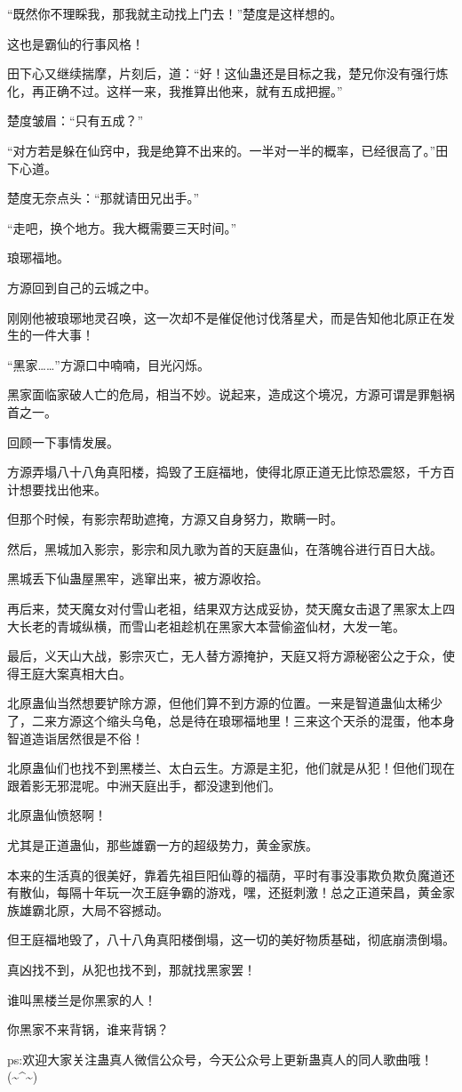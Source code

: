 \begin{this_body}
“既然你不理睬我，那我就主动找上门去！”楚度是这样想的。

这也是霸仙的行事风格！

田下心又继续揣摩，片刻后，道：“好！这仙蛊还是目标之我，楚兄你没有强行炼化，再正确不过。这样一来，我推算出他来，就有五成把握。”

楚度皱眉：“只有五成？”

“对方若是躲在仙窍中，我是绝算不出来的。一半对一半的概率，已经很高了。”田下心道。

楚度无奈点头：“那就请田兄出手。”

“走吧，换个地方。我大概需要三天时间。”

琅琊福地。

方源回到自己的云城之中。

刚刚他被琅琊地灵召唤，这一次却不是催促他讨伐落星犬，而是告知他北原正在发生的一件大事！

“黑家……”方源口中喃喃，目光闪烁。

黑家面临家破人亡的危局，相当不妙。说起来，造成这个境况，方源可谓是罪魁祸首之一。

回顾一下事情发展。

方源弄塌八十八角真阳楼，捣毁了王庭福地，使得北原正道无比惊恐震怒，千方百计想要找出他来。

但那个时候，有影宗帮助遮掩，方源又自身努力，欺瞒一时。

然后，黑城加入影宗，影宗和凤九歌为首的天庭蛊仙，在落魄谷进行百日大战。

黑城丢下仙蛊屋黑牢，逃窜出来，被方源收拾。

再后来，焚天魔女对付雪山老祖，结果双方达成妥协，焚天魔女击退了黑家太上四大长老的青城纵横，而雪山老祖趁机在黑家大本营偷盗仙材，大发一笔。

最后，义天山大战，影宗灭亡，无人替方源掩护，天庭又将方源秘密公之于众，使得王庭大案真相大白。

北原蛊仙当然想要铲除方源，但他们算不到方源的位置。一来是智道蛊仙太稀少了，二来方源这个缩头乌龟，总是待在琅琊福地里！三来这个天杀的混蛋，他本身智道造诣居然很是不俗！

北原蛊仙们也找不到黑楼兰、太白云生。方源是主犯，他们就是从犯！但他们现在跟着影无邪混呢。中洲天庭出手，都没逮到他们。

北原蛊仙愤怒啊！

尤其是正道蛊仙，那些雄霸一方的超级势力，黄金家族。

本来的生活真的很美好，靠着先祖巨阳仙尊的福荫，平时有事没事欺负欺负魔道还有散仙，每隔十年玩一次王庭争霸的游戏，嘿，还挺刺激！总之正道荣昌，黄金家族雄霸北原，大局不容撼动。

但王庭福地毁了，八十八角真阳楼倒塌，这一切的美好物质基础，彻底崩溃倒塌。

真凶找不到，从犯也找不到，那就找黑家罢！

谁叫黑楼兰是你黑家的人！

你黑家不来背锅，谁来背锅？

ps:欢迎大家关注蛊真人微信公众号，今天公众号上更新蛊真人的同人歌曲哦！(\~{}\^{}\~{})

\end{this_body}

